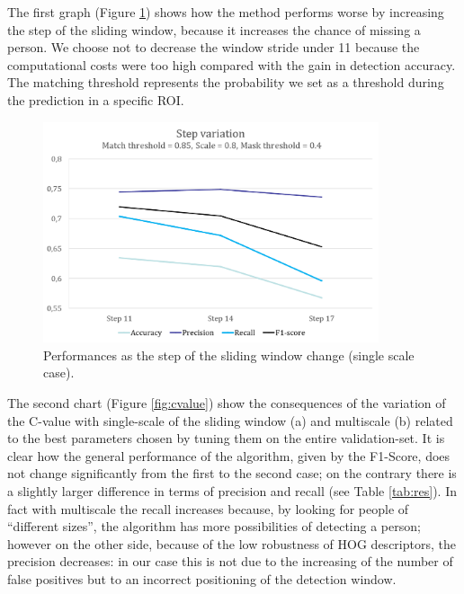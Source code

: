 \documentclass[a4paper,letterpaper, 11pt, onecolumn]{article} %
\begin{document}
The first graph (Figure \ref{fig:step}) shows how the method performs worse by increasing the step of the sliding window, because it increases the chance of missing a person. We choose not to decrease the window stride under 11 because the computational costs were too high compared with the gain in detection accuracy. The matching threshold represents the probability we set as a threshold during the prediction in a specific ROI.
\begin{figure}[h!]
\centering
\includegraphics[height=6.5cm]{step_variation.png} 
\caption{Performances as the step of the sliding window change (single scale case).}
\label{fig:step}
\end{figure}

The second chart (Figure \ref{fig:cvalue}) show the consequences of the variation of the C-value with single-scale of the sliding window (a) and multiscale (b) related to the best parameters chosen by tuning them on the entire validation-set. It is clear how the general performance of the algorithm, given by the F1-Score, does not change significantly from the first to the second case; on the contrary there is a slightly larger difference in terms of precision and recall (see Table \ref{tab:res}). In fact with multiscale the recall increases because, by looking for people of ``different sizes'', the algorithm has more possibilities of detecting a person; however on the other side, because of the low robustness of HOG descriptors,  the precision decreases: in our case this is not due to the increasing of the number of false positives but to an incorrect positioning of the detection window. 
\end{document}
